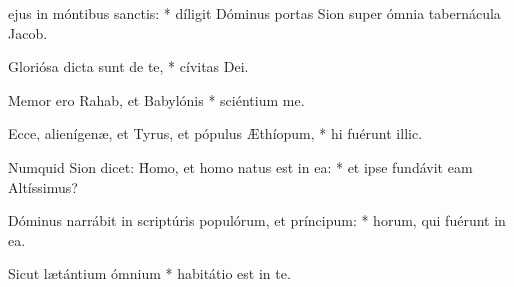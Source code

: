 \begin{psalmus}

     ejus in móntibus sanctis: * díligit Dóminus portas Sion super ómnia tabernácula Jacob.

    Gloriósa dicta sunt de te, * cívitas Dei.

    Memor ero Rahab, et Babylónis * sciéntium me.

    Ecce, alienígenæ, et Tyrus, et pópulus Æthíopum, * hi fuérunt illic.

    Numquid Sion dicet: \f Homo, et homo natus est in ea: * et ipse fundávit eam Altíssimus?

    Dóminus narrábit in scriptúris populórum, et príncipum: * horum, qui fuérunt in ea.

    Sicut lætántium ómnium * habitátio est in te.

\end{psalmus}
